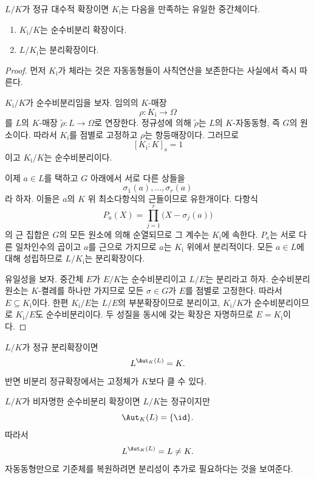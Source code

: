 \begin{theorem}[순수비분리부분을 먼저 놓는 분해]
$L/K$가 정규 대수적 확장이면 $K_{\mathrm i}$는 다음을 만족하는 유일한 중간체이다.
\begin{enumerate}[label=(\roman*)]
  \item $K_{\mathrm i}/K$는 순수비분리 확장이다.
  \item $L/K_{\mathrm i}$는 분리확장이다.
\end{enumerate}
\end{theorem}

\begin{proof}
먼저 $K_{\mathrm i}$가 체라는 것은 자동동형들이 사칙연산을 보존한다는 사실에서 즉시 따른다.

$K_{\mathrm i}/K$가 순수비분리임을 보자. 임의의 $K$-매장
\[
  \rho:K_{\mathrm i}\longrightarrow\Omega
\]
를 $L$의 $K$-매장 $\widetilde\rho:L\to\Omega$로 연장한다. 정규성에 의해 $\widetilde\rho$는 $L$의 $K$-자동동형, 즉 $G$의 원소이다. 따라서 $K_{\mathrm i}$를 점별로 고정하고 $\rho$는 항등매장이다. 그러므로
\[
  [K_{\mathrm i}:K]_{\mathrm s}=1
\]
이고 $K_{\mathrm i}/K$는 순수비분리이다.

이제 $a\in L$를 택하고 $G$ 아래에서 서로 다른 상들을
\[
  \sigma_1(a),\dots,\sigma_r(a)
\]
라 하자. 이들은 $a$의 $K$ 위 최소다항식의 근들이므로 유한개이다. 다항식
\[
  P_a(X)=\prod_{j=1}^r\bigl(X-\sigma_j(a)\bigr)
\]
의 근 집합은 $G$의 모든 원소에 의해 순열되므로 그 계수는 $K_{\mathrm i}$에 속한다. $P_a$는 서로 다른 일차인수의 곱이고 $a$를 근으로 가지므로 $a$는 $K_{\mathrm i}$ 위에서 분리적이다. 모든 $a\in L$에 대해 성립하므로 $L/K_{\mathrm i}$는 분리확장이다.

유일성을 보자. 중간체 $E$가 $E/K$는 순수비분리이고 $L/E$는 분리라고 하자. 순수비분리 원소는 $K$-켤레를 하나만 가지므로 모든 $\sigma\in G$가 $E$를 점별로 고정한다. 따라서 $E\subseteq K_{\mathrm i}$이다. 한편 $K_{\mathrm i}/E$는 $L/E$의 부분확장이므로 분리이고, $K_{\mathrm i}/K$가 순수비분리이므로 $K_{\mathrm i}/E$도 순수비분리이다. 두 성질을 동시에 갖는 확장은 자명하므로 $E=K_{\mathrm i}$이다.
\end{proof}

\begin{corollary}
$L/K$가 정규 분리확장이면
\[
  L^{\Aut_K(L)}=K.
\]
반면 비분리 정규확장에서는 고정체가 $K$보다 클 수 있다.
\end{corollary}

\begin{example}
$L/K$가 비자명한 순수비분리 확장이면 $L/K$는 정규이지만
\[
  \Aut_K(L)=\{\id\}.
\]
따라서
\[
  L^{\Aut_K(L)}=L\ne K.
\]
자동동형만으로 기준체를 복원하려면 분리성이 추가로 필요하다는 것을 보여준다.
\end{example}

